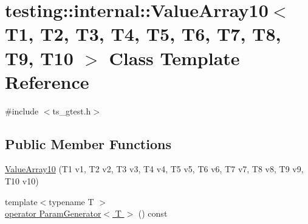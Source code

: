 \hypertarget{classtesting_1_1internal_1_1ValueArray10}{\section{testing\-:\-:internal\-:\-:Value\-Array10$<$ T1, T2, T3, T4, T5, T6, T7, T8, T9, T10 $>$ Class Template Reference}
\label{classtesting_1_1internal_1_1ValueArray10}
}


{\ttfamily \#include $<$ts\-\_\-gtest.\-h$>$}

\subsection*{Public Member Functions}
\begin{DoxyCompactItemize}
\item 
\hyperlink{classtesting_1_1internal_1_1ValueArray10_a763527165bcd1d8e7c366f979b76736b}{Value\-Array10} (T1 v1, T2 v2, T3 v3, T4 v4, T5 v5, T6 v6, T7 v7, T8 v8, T9 v9, T10 v10)
\item 
{\footnotesize template$<$typename T $>$ }\\\hyperlink{classtesting_1_1internal_1_1ValueArray10_a378f01ab44ce69eb6cb586b9194c9f9c}{operator Param\-Generator$<$ T $>$} () const 
\end{DoxyCompactItemize}


